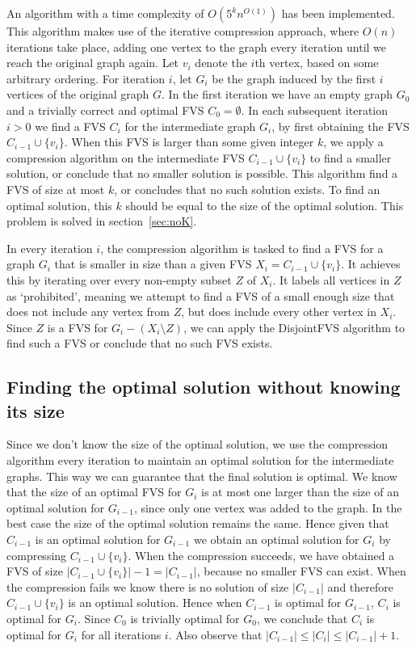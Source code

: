 
An algorithm with a time complexity of $O(5^kn^{O(1)})$ has been implemented. This algorithm makes use of the iterative
compression approach, where $O(n)$ iterations take place, adding one vertex to the graph every iteration until we reach
the original graph again. Let $v_i$ denote the $i$th vertex, based on some arbitrary ordering. For iteration $i$, let
$G_i$ be the graph induced by the first $i$ vertices of the original graph $G$. In the first iteration we have an empty
graph $G_0$ and a trivially correct and optimal FVS $C_0 = \emptyset$. In each subsequent iteration $i>0$ we find a FVS
$C_i$ for the intermediate graph $G_i$, by first obtaining the FVS $C_{i-1} \cup \{v_i\}$. When this FVS is larger than
some given integer $k$, we apply a compression algorithm on the intermediate FVS $C_{i-1} \cup \{v_i\}$ to find a
smaller solution, or conclude that no smaller solution is possible. This algorithm find a FVS of size at most $k$, or
concludes that no such solution exists. To find an optimal solution, this $k$ should be equal to the size of the optimal
solution. This problem is solved in section~\ref{sec:noK}.

In every iteration $i$, the compression algorithm is tasked to find a FVS for a graph $G_i$ that is smaller in size than
a given FVS $X_i = C_{i-1} \cup \{v_i\}$. It achieves this by iterating over every non-empty subset $Z$ of $X_i$. It
labels all vertices in $Z$ as `prohibited', meaning we attempt to find a FVS of a small enough size that does not
include any vertex from $Z$, but does include every other vertex in $X_i$. Since $Z$ is a FVS for $G_i-(X_i\setminus
Z)$, we can apply the {\sc DisjointFVS} algorithm  to find such a FVS or conclude that no such FVS
exists.

\subsection{Finding the optimal solution without knowing its size} \label{sec:noKi}
Since we don't know the size of the
optimal solution, we use the compression algorithm every iteration to maintain an optimal solution for the intermediate
graphs. This way we can guarantee that the final solution is optimal. We know that the size of an optimal FVS for $G_i$
is at most one larger than the size of an optimal solution for $G_{i-1}$, since only one vertex was added to the graph.
In the best case the size of the optimal solution remains the same. Hence given that $C_{i-1}$ is an optimal solution
for $G_{i-1}$ we obtain an optimal solution for $G_i$ by compressing $C_{i-1} \cup \{v_i\}$. When the compression
succeeds, we have obtained a FVS of size $|C_{i-1} \cup \{v_i\}|-1 = |C_{i-1}|$, because no smaller FVS can exist. When
the compression fails we know there is no solution of size $|C_{i-1}|$ and therefore $C_{i-1} \cup \{v_i\}$ is an
optimal solution. Hence when $C_{i-1}$ is optimal for $G_{i-1}$, $C_i$ is optimal for $G_i$. Since $C_0$ is trivially
optimal for $G_0$, we conclude that $C_i$ is optimal for $G_i$ for all iterations $i$. Also observe that $|C_{i-1}| \leq
|C_i| \leq |C_{i-1}|+1$.

